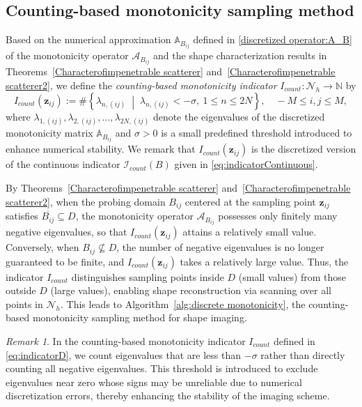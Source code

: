 \documentclass[11pt,reqno,twoside]{amsart}
\theoremstyle{definition}
\theoremstyle{remark}
\newtheorem{rem}{Remark}[section]
\numberwithin{equation}{section}
\begin{document}
\subsection{Counting-based monotonicity sampling method}\label{subsec:discrete sampling}

Based on the numerical approximation $\mathbb A_{B_{ij}}$ defined in \eqref{discretized operator:A_B} of the monotonicity operator $\mathcal{A}_{B_{ij}}$ and the shape characterization results in
Theorems~\ref{Characterofimpenetrable scatterer} and~\ref{Characterofimpenetrable scatterer2}, we define the \emph{counting-based monotonicity indicator} $I_{count}:\mathcal{N}_h	\to \mathbb{N}$ by
\begin{equation}\label{eq:indicatorD}
I_{count}(\mathbf{z}_{ij}):=\#\left\{\lambda_{n,(ij)}\;\middle|\;\lambda_{n,(ij)} < -\sigma,\
1 \leq n \leq 2N \right\}, \quad -M \leq i,j \leq M,
\end{equation}
where $\lambda_{1,(ij)}, \lambda_{2,(ij)}, \dots, \lambda_{2N,(ij)}$ denote the eigenvalues of the discretized monotonicity matrix \(\mathbb A_{B_{ij}}\) and $\sigma > 0$ is a small predefined threshold introduced to enhance numerical stability.
We remark that $I_{count}(\mathbf{z}_{ij})$ is the discretized version of the continuous indicator ${\mathcal I}_{count}(B)$ given in \eqref{eq:indicatorContinuous}.

By Theorems~\ref{Characterofimpenetrable scatterer} and~\ref{Characterofimpenetrable scatterer2}, when the probing domain $B_{ij}$ centered at the sampling point $\mathbf{z}_{ij}$ satisfies $\overline{B_{ij}}\subseteq D$, the monotonicity operator $\mathcal{A}_{B_{ij}}$ possesses only finitely many negative eigenvalues, so that $I_{count}(\mathbf{z}_{ij})$ attains a relatively small value. Conversely, when $B_{ij}\not\subseteq D$, the number of negative eigenvalues is no longer guaranteed to be finite, and $I_{count}(\mathbf{z}_{ij})$ takes a relatively large value. Thus, the indicator $I_{count}$ distinguishes sampling points inside $D$ (small values) from those outside $D$ (large values), enabling shape reconstruction via scanning over all points in $\mathcal{N}_h$. This leads to Algorithm~\ref{alg:discrete monotonicity}, the counting-based monotonicity sampling method for shape imaging.

\begin{rem}
In the counting-based monotonicity indicator $I_{count}$ defined in \eqref{eq:indicatorD}, we count eigenvalues that are less than $-\sigma$ rather than directly counting all negative eigenvalues. This threshold is introduced to exclude eigenvalues near zero whose signs may be unreliable due to numerical discretization errors, thereby enhancing the stability of the imaging scheme.
\end{rem}
\end{document}
